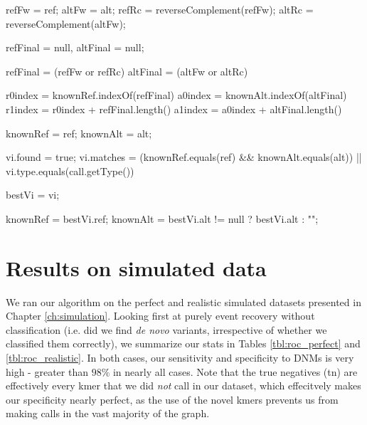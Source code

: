 \begin{algorithm}
\begin{algorithmic}[1]

            \State refFw = ref;
            \State altFw = alt;
            \State refRc = reverseComplement(refFw);
            \State altRc = reverseComplement(altFw);

            \State refFinal = null, altFinal = null;

                \State refFinal = (refFw or refRc)
                \State altFinal = (altFw or altRc)
            \EndIf

                \State r0index = knownRef.indexOf(refFinal)
                \State a0index = knownAlt.indexOf(altFinal)
                \State r1index = r0index + refFinal.length()
                \State a1index = a0index + altFinal.length()

                    knownRef = ref;
                    knownAlt = alt;
                \EndIf
            \EndIf
        \EndIf

        \State vi.found = true;
        \State vi.matches = (knownRef.equals(ref) \&\& knownAlt.equals(alt)) || vi.type.equals(call.getType())

            \State bestVi = vi;
        \EndIf

            \State knownRef = bestVi.ref;
            \State knownAlt = bestVi.alt != null ? bestVi.alt : "";
        \EndIf
    \EndFor
\EndFunction
\end{algorithmic}
\end{algorithm}

\section{Results on simulated data}

We ran our algorithm on the perfect and realistic simulated datasets presented in Chapter \ref{ch:simulation}.  Looking first at purely event recovery without classification (i.e. did we find \textit{de novo} variants, irrespective of whether we classified them correctly), we summarize our stats in Tables \ref{tbl:roc_perfect} and \ref{tbl:roc_realistic}.  In both cases, our sensitivity and specificity to DNMs is very high - greater than $98\%$ in nearly all cases.  Note that the true negatives (tn) are effectively every kmer that we did \textit{not} call in our dataset, which effecitvely makes our specificity nearly perfect, as the use of the novel kmers prevents us from making calls in the vast majority of the graph.

